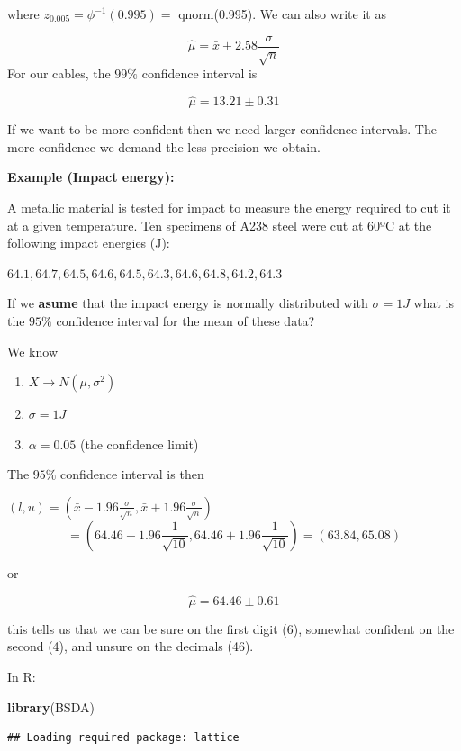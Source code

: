 \documentclass[
]{book}
\newenvironment{Shaded}{\begin{snugshade}}{\end{snugshade}}
\newcommand{\FunctionTok}[1]{\textcolor[rgb]{0.13,0.29,0.53}{\textbf{#1}}}
\newcommand{\NormalTok}[1]{#1}
\providecommand{\tightlist}{%
  \setlength{\itemsep}{0pt}\setlength{\parskip}{0pt}}
\begin{document}
where \(z_{0.005}=\phi^{-1}(0.995)=\) qnorm(0.995). We can also write it as

\[\hat{\mu}=\bar{x} \pm 2.58\frac{\sigma}{\sqrt{n}}\]
For our cables, the \(99\%\) confidence interval is

\[\hat{\mu}= 13.21 \pm 0.31\]

If we want to be more confident then we need larger confidence intervals. The more confidence we demand the less precision we obtain.

\textbf{Example (Impact energy):}

A metallic material is tested for impact to measure the energy required to cut it at a given temperature. Ten specimens of A238 steel were cut at 60ºC at the following impact energies (J):

\(64.1, 64.7, 64.5, 64.6, 64.5, 64.3, 64.6, 64.8, 64.2, 64.3\)

If we \textbf{asume} that the impact energy is normally distributed with \(\sigma=1J\) what is the \(95\%\) confidence interval for the mean of these data?

We know

\begin{enumerate}
\def\labelenumi{\arabic{enumi}.}
\tightlist
\item
  \(X \rightarrow N(\mu, \sigma^2)\)
\item
  \(\sigma=1J\)
\item
  \(\alpha=0.05\) (the confidence limit)
\end{enumerate}

The \(95\%\) confidence interval is then

\((l,u)=(\bar{x}-1.96 \frac{\sigma}{\sqrt{n}}, \bar{x}+1.96 \frac{\sigma}{\sqrt{n}})\)
\[=(64.46-1.96 \frac{1}{\sqrt{10}}, 64.46+1.96  \frac{1}{\sqrt{10}})=(63.84,65.08)\]

or

\[\hat{\mu}=64.46 \pm 0.61\]

this tells us that we can be sure on the first digit (6), somewhat confident on the second (4), and unsure on the decimals (46).

In R:

\begin{Shaded}
\begin{Highlighting}[]
\FunctionTok{library}\NormalTok{(BSDA) }
\end{Highlighting}
\end{Shaded}

\begin{verbatim}
## Loading required package: lattice
\end{verbatim}
\end{document}
